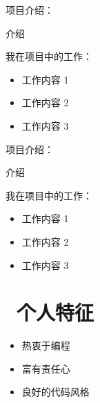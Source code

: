\documentclass{resume}
\begin{document}
\vspace{1mm}\par
\noindent
项目介绍：

\vspace{1mm}\par
\setlength{\parindent}{2ex}
介绍

\vspace{1mm}\par
\noindent
我在项目中的工作：

\begin{itemize}[parsep=1ex]
  \item 工作内容 1
  \item 工作内容 2
  \item 工作内容 3
\end{itemize}


\vspace{1mm}\par
\noindent
项目介绍：

\vspace{1mm}\par
\setlength{\parindent}{2ex}

介绍
\vspace{1mm}\par
\noindent

我在项目中的工作：
\begin{itemize}[parsep=1ex]
  \item 工作内容 1
  \item 工作内容 2
  \item 工作内容 3
\end{itemize}

\section{\faUser\ 个人特征} \vspace{1mm}

\begin{itemize}[parsep=1ex]
  \item 热衷于编程
  \item 富有责任心
  \item 良好的代码风格
\end{itemize}
\end{document}
